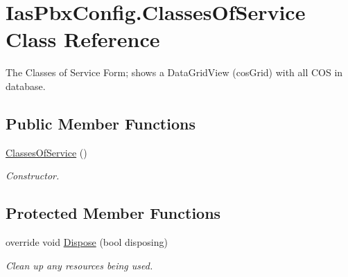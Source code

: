 \hypertarget{class_ias_pbx_config_1_1_classes_of_service}{
\section{IasPbxConfig.ClassesOfService Class Reference}
\label{class_ias_pbx_config_1_1_classes_of_service}
}


The Classes of Service Form; shows a DataGridView (cosGrid) with all COS in database.  
\subsection*{Public Member Functions}
\begin{DoxyCompactItemize}
\item 
\hyperlink{class_ias_pbx_config_1_1_classes_of_service_a5ee02eb862c50aaaa88efed9c438ccd8}{ClassesOfService} ()
\begin{DoxyCompactList}\small\item\em Constructor. \item\end{DoxyCompactList}\end{DoxyCompactItemize}
\subsection*{Protected Member Functions}
\begin{DoxyCompactItemize}
\item 
override void \hyperlink{class_ias_pbx_config_1_1_classes_of_service_af549a6af675cf68b774598a0b26f3070}{Dispose} (bool disposing)
\begin{DoxyCompactList}\small\item\em Clean up any resources being used. \item\end{DoxyCompactList}\end{DoxyCompactItemize}
